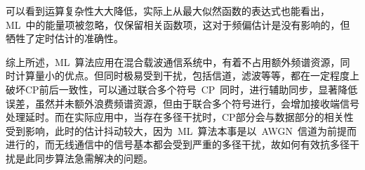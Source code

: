 可以看到运算复杂性大大降低，实际上从最大似然函数的表达式也能看出，ML~中的能量项被忽略，仅保留相关函数项，这对于频偏估计是没有影响的，但牺牲了定时估计的准确性。

综上所述，ML~算法应用在混合载波通信系统中，有着不占用额外频谱资源，同时计算量小的优点。但同时极易受到干扰，包括信道，滤波等等，都在一定程度上破坏CP前后一致性，可以通过联合多个符号~CP~同时，进行辅助同步，显著降低误差，虽然并未额外浪费频谱资源，但由于联合多个符号进行，会增加接收端信号处理延时。而在实际应用中，当存在多径干扰时，CP部分会与数据部分的相关性受到影响，此时的估计抖动较大，因为~ML~算法本事是以~AWGN~信道为前提而进行的，而无线通信中的信号基本都会受到严重的多径干扰，故如何有效抗多径干扰是此同步算法急需解决的问题。





